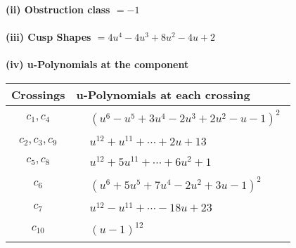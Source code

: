 \documentclass[1p]{elsarticle_modified}
\theoremstyle{definition}
\begin{document}
\flushleft \textbf{(ii) Obstruction class $= -1$}\\~\\
\flushleft \textbf{(iii) Cusp Shapes $= 4 u^4-4 u^3+8 u^2-4 u+2$}\\~\\
\newpage\renewcommand{\arraystretch}{1}
\flushleft \textbf{(iv) u-Polynomials at the component}\newline \\
\begin{tabular}{m{50pt}|m{274pt}}
Crossings & \hspace{64pt}u-Polynomials at each crossing \\
\hline $$\begin{aligned}c_{1},c_{4}\end{aligned}$$&$\begin{aligned}
&(u^6- u^5+3 u^4-2 u^3+2 u^2- u-1)^2
\end{aligned}$\\
\hline $$\begin{aligned}c_{2},c_{3},c_{9}\end{aligned}$$&$\begin{aligned}
&u^{12}+u^{11}+\cdots+2 u+13
\end{aligned}$\\
\hline $$\begin{aligned}c_{5},c_{8}\end{aligned}$$&$\begin{aligned}
&u^{12}+5 u^{11}+\cdots+6 u^2+1
\end{aligned}$\\
\hline $$\begin{aligned}c_{6}\end{aligned}$$&$\begin{aligned}
&(u^6+5 u^5+7 u^4-2 u^2+3 u-1)^2
\end{aligned}$\\
\hline $$\begin{aligned}c_{7}\end{aligned}$$&$\begin{aligned}
&u^{12}- u^{11}+\cdots-18 u+23
\end{aligned}$\\
\hline $$\begin{aligned}c_{10}\end{aligned}$$&$\begin{aligned}
&(u-1)^{12}
\end{aligned}$\\
\hline
\end{tabular}\\~\\
\end{document}
